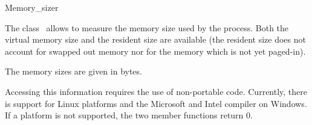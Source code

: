 
\begin{ccRefClass}{Memory_sizer}

\ccDefinition

The class \ccRefName\ allows to measure the memory size used by the process.
Both the virtual memory size and the resident size are available (the resident
size does not account for swapped out memory nor for the memory which is not
yet paged-in).


\ccTypes
\ccThreeToTwo

The memory sizes are given in bytes.


\ccCreation

\ccPropagateThreeToTwoColumns


\ccOperations

\ccGlue
{}


\ccImplementation

Accessing this information requires the use of non-portable code.
Currently, there is support for Linux platforms and the Microsoft and Intel
compiler on Windows.  If a platform is not supported, the two member
functions return 0.

\end{ccRefClass}
